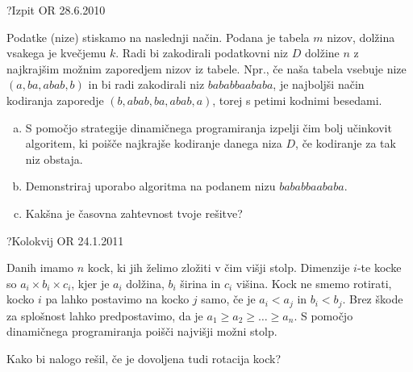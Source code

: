 \begin{naloga}{?}{Izpit OR 28.6.2010}
\begin{vprasanje}
Podatke (nize) stiskamo na naslednji način.
Podana je tabela $m$ nizov, dolžina vsakega je kvečjemu $k$.
Radi bi zakodirali podatkovni niz $D$ dolžine $n$
z najkrajšim možnim zaporedjem nizov iz tabele.
Npr., če naša tabela vsebuje nize $(a, ba, abab, b)$
in bi radi zakodirali niz $bababbaababa$,
je najboljši način kodiranja zaporedje $(b, abab, ba, abab, a)$,
torej s petimi kodnimi besedami.

\begin{enumerate}[(a)]
\item S pomočjo strategije dinamičnega programiranja
izpelji čim bolj učinkovit algoritem,
ki poišče najkrajše kodiranje danega niza $D$,
če kodiranje za tak niz obstaja.

\item Demonstriraj uporabo algoritma na podanem nizu $bababbaababa$.

\item Kakšna je časovna zahtevnost tvoje rešitve?
\end{enumerate}
\end{vprasanje}
\begin{odgovor}
\end{odgovor}
\end{naloga}


\begin{naloga}{?}{Kolokvij OR 24.1.2011}
\begin{vprasanje}
Danih imamo $n$ kock, ki jih želimo zložiti v čim višji stolp.
Dimenzije $i$-te kocke so $a_i \times b_i \times c_i$,
kjer je $a_i$ dolžina, $b_i$ širina in $c_i$ višina.
Kock ne smemo rotirati,
kocko $i$ pa lahko postavimo na kocko $j$ samo,
če je $a_i < a_j$ in $b_i < b_j$.
Brez škode za splošnost lahko predpostavimo,
da je $a_1 \ge a_2 \ge \dots \ge a_n$.
S pomočjo dinamičnega programiranja poišči najvišji možni stolp.

Kako bi nalogo rešil, če je dovoljena tudi rotacija kock?
\end{vprasanje}
\begin{odgovor}
\end{odgovor}
\end{naloga}


